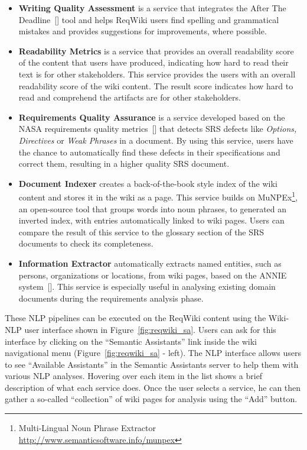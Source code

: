 \documentclass[10pt,twoside,openany,bibtotoc,liststotoc]{scrbook}
\newcommand{\sa}{Semantic Assistants\xspace}
\begin{document}
\begin{itemize}
\item \textbf{Writing Quality Assessment} is a service that integrates the After The Deadline~[\cite{Mudge10}] tool and helps ReqWiki users find spelling and grammatical mistakes and provides suggestions for improvements, where possible.

\item \textbf{Readability Metrics} is a service that provides an overall readability score of the content that users have produced, indicating how hard to read their text is for other stakeholders. This service provides the users with an overall readability score of the wiki content. The result score indicates how hard to read and comprehend the artifacts are for other stakeholders.

\item \textbf{Requirements Quality Assurance} is a service developed based on the NASA requirements quality metrics~[\cite{Laplante09}] that detects SRS defects like \emph{Options, Directives} or \emph{Weak Phrases} in a document. By using this service, users have the chance to automatically find these defects in their specifications and correct them, resulting in a higher quality SRS document.

\item \textbf{Document Indexer} creates a back-of-the-book style index of the wiki content and stores it in the wiki as a page. This service builds on MuNPEx\footnote{Multi-Lingual Noun Phrase Extractor \url{http://www.semanticsoftware.info/munpex}}, an open-source tool that groups words into noun phrases, to generated an inverted index, with entries automatically linked to wiki pages.  Users can compare the result of this service to the glossary section of the SRS documents to check its completeness.

\item \textbf{Information Extractor} automatically extracts named entities, such as persons, organizations or locations, from wiki pages, based on the ANNIE system~[\cite{cun11}]. This service is especially useful in analysing existing domain documents during the requirements analysis phase.
\end{itemize}

These NLP pipelines can be executed on the ReqWiki content using the Wiki-NLP user interface shown in Figure~\ref{fig:reqwiki_sa}. Users can ask for this interface by clicking on the ``\sa'' link inside the wiki navigational menu (Figure~\ref{fig:reqwiki_sa} - left). The NLP interface allows users to see ``Available Assistants'' in the \sa server to help them with various NLP analyses. Hovering over each item in the list shows a brief description of what each service does. Once the user selects a service, he can then gather a so-called ``collection'' of wiki pages for analysis using the ``Add'' button.
\end{document}
